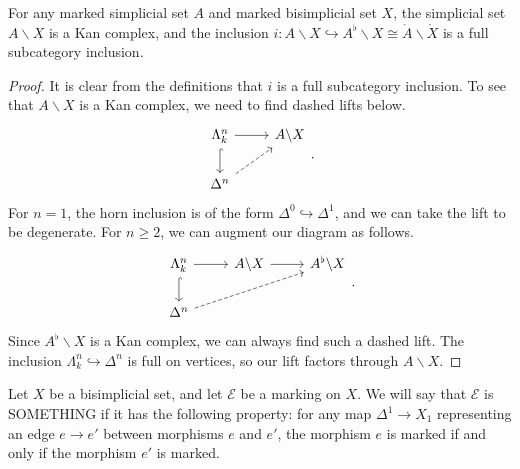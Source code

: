 \documentclass[main.tex]{subfiles}
\begin{document}
\begin{lemma}
  For any marked simplicial set $A$ and marked bisimplicial set $X$, the simplicial set $A \backslash X$ is a Kan complex, and the inclusion $i\colon A \backslash X \hookrightarrow A^{\flat} \backslash X \cong \mathring{A} \backslash \mathring{X}$ is a full subcategory inclusion.
\end{lemma}
\begin{proof}

  It is clear from the definitions that $i$ is a full subcategory inclusion. To see that $A \backslash X$ is a Kan complex, we need to find dashed lifts below.
  \begin{equation*}
    \begin{tikzcd}
      \Lambda^{n}_{k}
      \arrow[r]
      \arrow[d, hook]
      & A \backslash X
      \\
      \Delta^{n}
      \arrow[ur, dashed]
    \end{tikzcd}.
  \end{equation*}
  For $n = 1$, the horn inclusion is of the form $\Delta^{0} \hookrightarrow \Delta^{1}$, and we can take the lift to be degenerate. For $n \geq 2$, we can augment our diagram as follows.
  \begin{equation*}
    \begin{tikzcd}
      \Lambda^{n}_{k}
      \arrow[r]
      \arrow[d, hook]
      & A \backslash X
      \arrow[r]
      & A^{\flat} \backslash X
      \\
      \Delta^{n}
      \arrow[urr, dashed]
    \end{tikzcd}.
  \end{equation*}
  Since $A^{\flat} \backslash X$ is a Kan complex, we can always find such a dashed lift. The inclusion $\Lambda^{n}_{k} \hookrightarrow \Delta^{n}$ is full on vertices, so our lift factors through $A \backslash X$.
\end{proof}

\begin{definition}
  Let $X$ be a bisimplicial set, and let $\mathcal{E}$ be a marking on $X$. We will say that $\mathcal{E}$ is SOMETHING if it has the following property: for any map $\Delta^{1} \to X_{1}$ representing an edge $e \to e'$ between morphisms $e$ and $e'$, the morphism $e$ is marked if and only if the morphism $e'$ is marked.
\end{definition}
\end{document}
